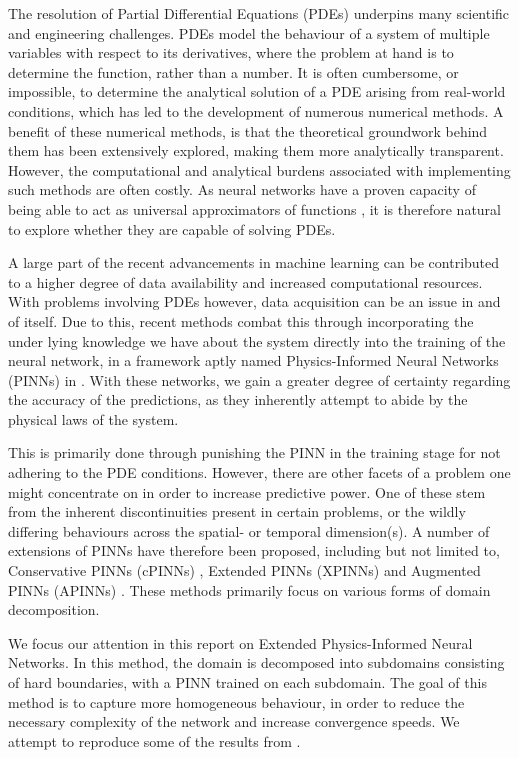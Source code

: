 The resolution of Partial Differential Equations (PDEs) underpins many scientific and engineering challenges.
PDEs model the behaviour of a system of multiple variables with respect to its derivatives, where the problem at hand is to determine the function, rather than a number.
It is often cumbersome, or impossible, to determine the analytical solution of a PDE arising from real-world conditions, which has led to the development of numerous numerical methods.
A benefit of these numerical methods, is that the theoretical groundwork behind them has been extensively explored, making them more analytically transparent.
However, the computational and analytical burdens associated with implementing such methods are often costly.
As neural networks have a proven capacity of being able to act as universal approximators of functions \cite{Cybenko1989ApproximationBS}, it is therefore natural to explore whether they are capable of solving PDEs.

A large part of the recent advancements in machine learning can be contributed to a higher degree of data availability and increased computational resources.
With problems involving PDEs however, data acquisition can be an issue in and of itself.
Due to this, recent methods combat this through incorporating the under lying knowledge we have about the system directly into the training of the neural network, in a framework aptly named Physics-Informed Neural Networks (PINNs) in \textcite{RAISSI2019686}.
With these networks, we gain a greater degree of certainty regarding the accuracy of the predictions, as they inherently attempt to abide by the physical laws of the system.

This is primarily done through punishing the PINN in the training stage for not adhering to the PDE conditions.
However, there are other facets of a problem one might concentrate on in order to increase predictive power.
One of these stem from the inherent discontinuities present in certain problems, or the wildly differing behaviours across the spatial- or temporal dimension(s).
A number of extensions of PINNs have therefore been proposed, including but not limited to, Conservative PINNs (cPINNs) \cite{2020CMAME.36513028J}, Extended PINNs (XPINNs) \cite{Jagtap2020ExtendedPN} and Augmented PINNs (APINNs) \cite{Hu_2023}.
These methods primarily focus on various forms of domain decomposition.

We focus our attention in this report on Extended Physics-Informed Neural Networks.
In this method, the domain is decomposed into subdomains consisting of hard boundaries, with a PINN trained on each subdomain.
The goal of this method is to capture more homogeneous behaviour, in order to reduce the necessary complexity of the network and increase convergence speeds.
We attempt to reproduce some of the results from \textcite{XPINN_generalize}.

